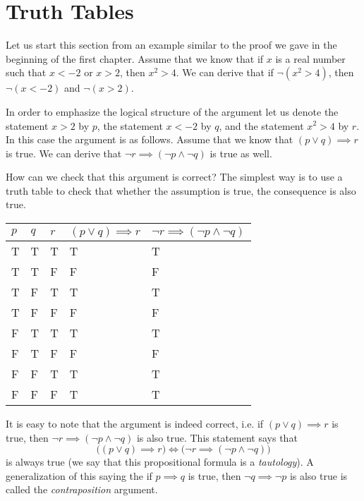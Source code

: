 \section{Truth Tables}
\label{section:truth-tables}

Let us start this section from an example similar to
the proof we gave in the beginning of the first chapter. Assume that we know
that if $x$ is a real number such that $x < -2$ or $x > 2$, then $x^2 > 4$. We
can derive that if $\lnot (x^2 > 4)$, then $\lnot (x < -2)$ and $\lnot (x > 2)$.

In order to emphasize the logical structure of the argument let us denote
the statement $x > 2$ by $p$, the statement $x < -2$ by $q$, and the statement
$x^2 > 4$ by $r$. In this case the argument is as follows.
Assume that we know that $(p \lor q) \implies r$ is true. We
can derive that $\lnot r \implies (\lnot p \land \lnot q)$ is true as well.

How can we check that this argument is correct? The simplest way is to use a
truth table to check that whether the assumption is true, the consequence is
also true.
\begin{center}
    \begin{tabular}{l l l l l}
        \toprule
        $p$ & $q$ & $r$ & $(p \lor q) \implies r$ &
        $\lnot r \implies (\lnot p \land \lnot q)$ \\
        \midrule
        T & T & T & T & T \\
        T & T & F & F & F \\
        T & F & T & T & T \\
        T & F & F & F & F \\
        F & T & T & T & T \\
        F & T & F & F & F \\
        F & F & T & T & T \\
        F & F & F & T & T \\
        \bottomrule
    \end{tabular}
\end{center}
It is easy to note that the argument is indeed correct, i.e.
if $(p \lor q) \implies r$ is true, then
$\lnot r \implies (\lnot p \land \lnot q)$ is also true.
This statement says that
\[
  \bigl((p \lor q) \implies r\bigr) \iff
  \bigl(\lnot r \implies (\lnot p \land \lnot q) \bigr)
\]
is always true (we say that this propositional formula is a
\emph{tautology}). A generalization of this saying the if $p \implies q$ is
true, then $\lnot q \implies \lnot p$ is also true is called the
\emph{contraposition} argument.


